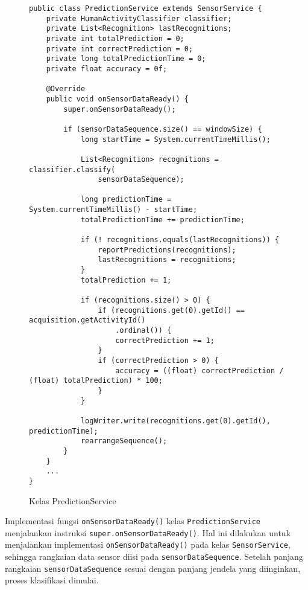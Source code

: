 \begin{figure}[h!]
\begin{verbatim}
public class PredictionService extends SensorService {
    private HumanActivityClassifier classifier;
    private List<Recognition> lastRecognitions;
    private int totalPrediction = 0;
    private int correctPrediction = 0;
    private long totalPredictionTime = 0;
    private float accuracy = 0f;

    @Override
    public void onSensorDataReady() {
        super.onSensorDataReady();

        if (sensorDataSequence.size() == windowSize) {
            long startTime = System.currentTimeMillis();

            List<Recognition> recognitions = classifier.classify(
                sensorDataSequence);

            long predictionTime = System.currentTimeMillis() - startTime;
            totalPredictionTime += predictionTime;

            if (! recognitions.equals(lastRecognitions)) {
                reportPredictions(recognitions);
                lastRecognitions = recognitions;
            }
            totalPrediction += 1;

            if (recognitions.size() > 0) {
                if (recognitions.get(0).getId() == acquisition.getActivityId()
                    .ordinal()) {
                    correctPrediction += 1;
                }
                if (correctPrediction > 0) {
                    accuracy = ((float) correctPrediction / (float) totalPrediction) * 100;
                }
            }

            logWriter.write(recognitions.get(0).getId(), predictionTime);
            rearrangeSequence();
        }
    }
    ...
}
\end{verbatim}
\caption{Kelas PredictionService}
\label{listing:aktvtas-predictionservice}
\end{figure}

Implementasi fungsi \texttt{onSensorDataReady()} kelas \texttt{PredictionService} menjalankan instruksi \texttt{super.onSensorDataReady()}. Hal ini dilakukan untuk menjalankan implementasi \texttt{onSensorDataReady()} pada kelas \texttt{SensorService}, sehingga rangkaian data sensor diisi pada \texttt{sensorDataSequence}. Setelah panjang rangkaian \texttt{sensorDataSequence} sesuai dengan panjang jendela yang diinginkan, proses klasifikasi dimulai.

